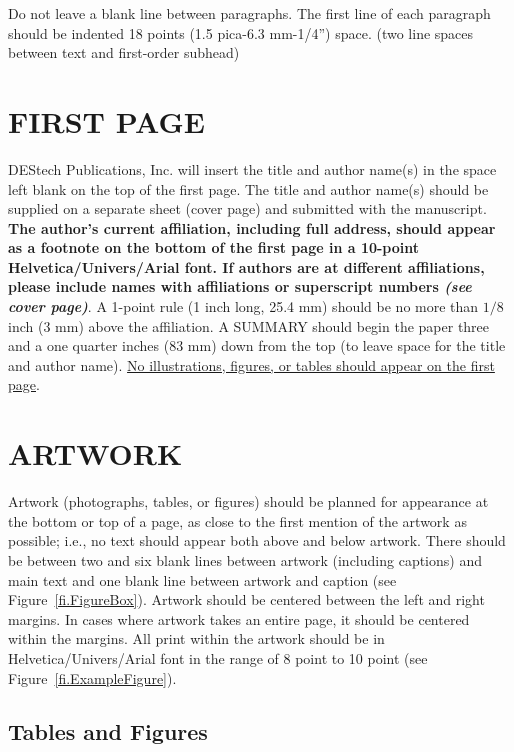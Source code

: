 \documentclass[]{asc}
\begin{document}
Do not leave a blank line between paragraphs. The first line of each paragraph should be indented 18 points (1.5 pica-6.3 mm-1/4'') space.
(two line spaces between text and first-order subhead)
 


\section*{FIRST PAGE}
DEStech Publications, Inc. will insert the title and author name(s) in the space left blank on the top of the first page. The title and author name(s) should be supplied on a separate sheet (cover page) and submitted with the manuscript. {\bf The author's current affiliation, including full address, should appear as a footnote on the bottom of the first page in a 10-point Helvetica/Univers/Arial font. If authors are at different affiliations, please include names with affiliations or superscript numbers {\it (see cover page)}}. A 1-point rule (1 inch long, 25.4 mm) should be no more than $1/8$ inch (3 mm) above the affiliation. A SUMMARY should begin the paper three and a one  quarter inches (83 mm) down from the top (to leave space for the title and author name). \underline{No illustrations, figures, or tables should appear on the first page}.


\section*{ARTWORK}

Artwork (photographs, tables, or figures) should be planned for appearance at the bottom or top of a page, as close to the first mention of the artwork as possible; i.e., no text should appear both above and below artwork. There should be between two and six blank lines between artwork (including captions) and main text and one blank line between artwork and caption (see Figure~\ref{fi.FigureBox}). Artwork should be centered between the left and right margins. In cases where artwork takes an entire page, it should be centered within the margins. All print within the artwork should be in Helvetica/Univers/Arial font in the range of 8 point to 10 point (see Figure~\ref{fi.ExampleFigure}).

\subsection*{Tables and Figures}
\end{document}
